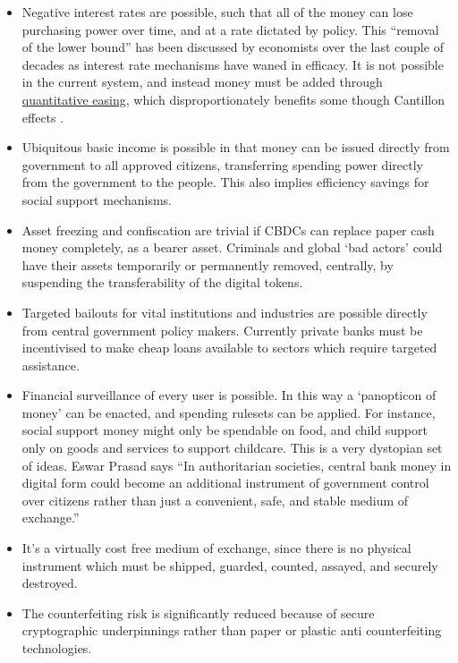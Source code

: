 \begin{itemize}
\item Negative interest rates are possible, such that all of the money can lose purchasing power over time, and at a rate dictated by policy. This ``removal of the lower bound'' has been discussed by economists over the last couple of decades as interest rate mechanisms have waned in efficacy. It is not possible in the current system, and instead money must be added through \href{https://www.bankofengland.co.uk/monetary-policy/quantitative-easing}{quantitative easing}, which disproportionately benefits some though Cantillon effects \cite{cantillon1756essai, bordo1983some}.  
\item Ubiquitous basic income is possible in that money can be issued directly from government to all approved citizens, transferring spending power directly from the government to the people. This also implies efficiency savings for social support mechanisms.
\item Asset freezing and confiscation are trivial if CBDCs can replace paper cash money completely, as a bearer asset. Criminals and global `bad actors' could have their assets temporarily or permanently removed, centrally, by suspending the transferability of the digital tokens.
\item Targeted bailouts for vital institutions and industries are possible directly from central government policy makers. Currently private banks must be incentivised to make cheap loans available to sectors which require targeted assistance.
\item Financial surveillance of every user is possible. In this way a `panopticon of money' can be enacted, and spending rulesets can be applied. For instance, social support money might only be spendable on food, and child support only on goods and services to support childcare. This is a very dystopian set of ideas. Eswar Prasad says ``In authoritarian societies, central bank money in digital form could become an additional instrument of government control over citizens rather than just a convenient, safe, and stable medium of exchange.'' \cite{prasad2021future}
\item It's a virtually cost free medium of exchange, since there is no physical instrument which must be shipped, guarded, counted, assayed, and securely destroyed.
\item The counterfeiting risk is significantly reduced because of secure cryptographic underpinnings rather than paper or plastic anti counterfeiting technologies.

\end{itemize}
